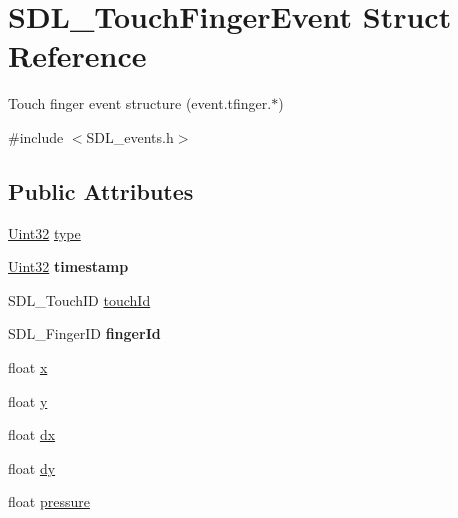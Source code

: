 \hypertarget{struct_s_d_l___touch_finger_event}{}\section{S\+D\+L\+\_\+\+Touch\+Finger\+Event Struct Reference}
\label{struct_s_d_l___touch_finger_event}


Touch finger event structure (event.\+tfinger.$\ast$)  




{\ttfamily \#include $<$S\+D\+L\+\_\+events.\+h$>$}

\subsection*{Public Attributes}
\begin{DoxyCompactItemize}
\item 
\hyperlink{_s_d_l__stdinc_8h_add440eff171ea5f55cb00c4a9ab8672d}{Uint32} \hyperlink{struct_s_d_l___touch_finger_event_a3883218fa3426065ca66086c100edbfa}{type}
\item 
\mbox{\label{struct_s_d_l___touch_finger_event_abde2ab5cb013bbd21e37a65e2f8fa666}} 
\hyperlink{_s_d_l__stdinc_8h_add440eff171ea5f55cb00c4a9ab8672d}{Uint32} {\bfseries timestamp}
\item 
S\+D\+L\+\_\+\+Touch\+ID \hyperlink{struct_s_d_l___touch_finger_event_ad7a6f39ec9af1bf47b160d18314edd70}{touch\+Id}
\item 
\mbox{\label{struct_s_d_l___touch_finger_event_a8616d46ed19906e3ee90a4d481d3a284}} 
S\+D\+L\+\_\+\+Finger\+ID {\bfseries finger\+Id}
\item 
float \hyperlink{struct_s_d_l___touch_finger_event_a0ce44b1342220fa17e9b9b4a77c2c906}{x}
\item 
float \hyperlink{struct_s_d_l___touch_finger_event_ac2bb8af638d2927a8e13f6ffe8f9384e}{y}
\item 
float \hyperlink{struct_s_d_l___touch_finger_event_ac6acac209d6e2bd659fdb6760081393d}{dx}
\item 
float \hyperlink{struct_s_d_l___touch_finger_event_a9c0320c5f18a6b9d10da657e166608c9}{dy}
\item 
float \hyperlink{struct_s_d_l___touch_finger_event_ab4fca822d0807b5748dbae8d3cc56524}{pressure}
\end{DoxyCompactItemize}


